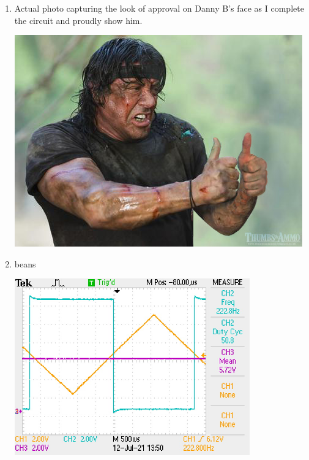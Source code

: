 \documentclass[a4paper,11pt]{article}
\begin{document}
\begin{preview}
\begin{enumerate}
    \item 
    Actual photo capturing the look of approval on Danny B's face as I complete the circuit and proudly show him.
    \begin{center}
        \includegraphics[width = \textwidth]{Danny_B.jpg}
    \end{center}
    \vspace{20pt}

    \item 
    beans
    \begin{center}
        \includegraphics[width = 0.8\textwidth]{50_duty.JPG}
    \end{center}
    \vspace{10pt}


\end{enumerate}
\end{preview}
\end{document}
